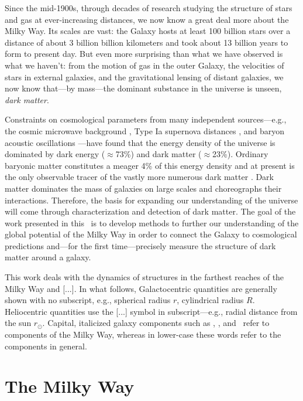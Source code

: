 Since the mid-1900s, through decades of research studying the structure of stars and gas at ever-increasing distances, we now know a great deal more about the Milky Way. Its scales are vast: the Galaxy hosts at least 100 billion stars over a distance of about 3 billion billion kilometers and took about 13 billion years to form to present day. But even more surprising than what we have observed is what we haven't: from the motion of gas in the outer Galaxy, the velocities of stars in external galaxies, and the gravitational lensing of distant galaxies, we now know that---by mass---the dominant substance in the universe is unseen, \emph{dark matter}.

Constraints on cosmological parameters from many independent sources---e.g., the cosmic microwave background \citep{planck15}, Type Ia supernova distances \citep{riess98, perlmutter99}, and baryon acoustic oscillations \citep{eisenstein05}---have found that the energy density of the universe is dominated by dark energy ($\approx$73\%) and dark matter ($\approx$23\%). Ordinary baryonic matter constitutes a meager 4\% of this energy density and at present is the only observable tracer of the vastly more numerous dark matter \citep[though the search for the dark matter particle is underway;][]{aprile11,luxdm12}. Dark matter dominates the mass of galaxies on large scales and choreographs their interactions. Therefore, the basis for expanding our understanding of the universe will come through characterization and detection of dark matter. %
The goal of the work presented in this \article\ is to develop methods to further our understanding of the global potential of the Milky Way in order to connect the Galaxy to cosmological predictions and---for the first time---precisely measure the structure of dark matter around a galaxy.

This work deals with the dynamics of structures in the farthest reaches of the Milky Way and [...]. In what follows, Galactocentric quantities are generally shown with no subscript, e.g., spherical radius $r$, cylindrical radius $R$. Heliocentric quantities use the [...] symbol in subscript---e.g., radial distance from the sun $r_\odot$. Capital, italicized galaxy components such as \mwdisk, \mwbulge, and \mwhalo\ refer to components of the Milky Way, whereas in lower-case these words refer to the components in general. 

\section{The Milky Way}\label{sec:milkyway}

